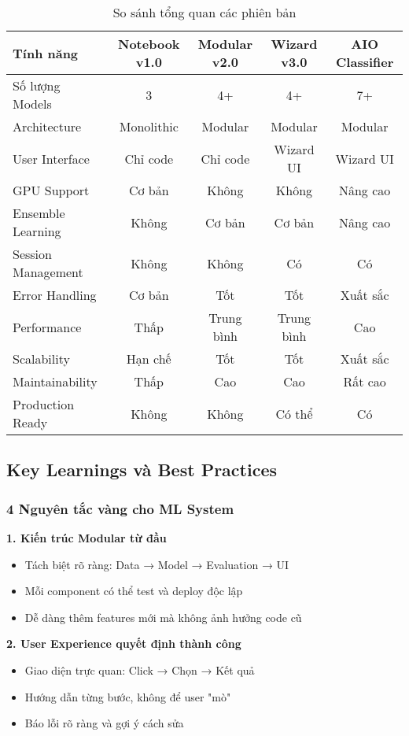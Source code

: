 \begin{table}[H]
\centering
\begin{tabular}{|l|c|c|c|c|}
\hline
\textbf{Tính năng} & \textbf{Notebook v1.0} & \textbf{Modular v2.0} & \textbf{Wizard v3.0} & \textbf{AIO Classifier} \\
\hline
Số lượng Models & 3 & 4+ & 4+ & 7+ \\
\hline
Architecture & Monolithic & Modular & Modular & Modular \\
\hline
User Interface & Chỉ code & Chỉ code & Wizard UI & Wizard UI \\
\hline
GPU Support & Cơ bản & Không & Không & Nâng cao \\
\hline
Ensemble Learning & Không & Cơ bản & Cơ bản & Nâng cao \\
\hline
Session Management & Không & Không & Có & Có \\
\hline
Error Handling & Cơ bản & Tốt & Tốt & Xuất sắc \\
\hline
Performance & Thấp & Trung bình & Trung bình & Cao \\
\hline
Scalability & Hạn chế & Tốt & Tốt & Xuất sắc \\
\hline
Maintainability & Thấp & Cao & Cao & Rất cao \\
\hline
Production Ready & Không & Không & Có thể & Có \\
\hline
\end{tabular}
\caption{So sánh tổng quan các phiên bản}
\end{table}

\subsection{Key Learnings và Best Practices}

\subsubsection{4 Nguyên tắc vàng cho ML System}

\textbf{1. Kiến trúc Modular từ đầu}
\begin{itemize}
    \item Tách biệt rõ ràng: Data → Model → Evaluation → UI
    \item Mỗi component có thể test và deploy độc lập
    \item Dễ dàng thêm features mới mà không ảnh hưởng code cũ
\end{itemize}

\textbf{2. User Experience quyết định thành công}
\begin{itemize}
    \item Giao diện trực quan: Click → Chọn → Kết quả
    \item Hướng dẫn từng bước, không để user "mò"
    \item Báo lỗi rõ ràng và gợi ý cách sửa
\end{itemize}

